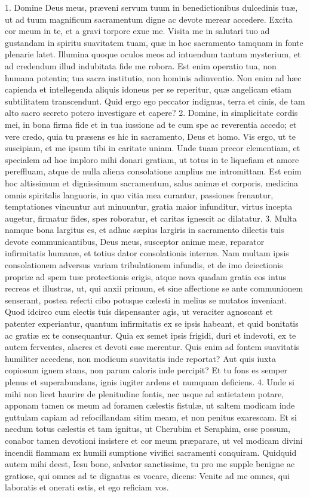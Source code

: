 1. Domine Deus meus, præveni servum tuum in benedictionibus dulcedinis tuæ, ut ad tuum magnificum sacramentum digne ac devote merear accedere. Excita cor meum in te, et a gravi torpore exue me. Visita me in salutari tuo ad gustandam in spiritu suavitatem tuam, quæ in hoc sacramento tamquam in fonte plenarie latet. Illumina quoque oculos meos ad intuendum tantum mysterium, et ad credendum illud indubitata fide me robora. Est enim operatio tua, non humana potentia; tua sacra institutio, non hominis adinventio. Non enim ad hæc capienda et intellegenda aliquis idoneus per se reperitur, quæ angelicam etiam subtilitatem transcendunt. Quid ergo ego peccator indignus, terra et cinis, de tam alto sacro secreto potero investigare et capere?
2. Domine, in simplicitate cordis mei, in bona firma fide et in tua iussione ad te cum spe ac reverentia accedo; et vere credo, quia tu præsens es hic in sacramento, Deus et homo. Vis ergo, ut te suscipiam, et me ipsum tibi in caritate uniam. Unde tuam precor clementiam, et specialem ad hoc imploro mihi donari gratiam, ut totus in te liquefiam et amore pereffluam, atque de nulla aliena consolatione amplius me intromittam. Est enim hoc altissimum et dignissimum sacramentum, salus animæ et corporis, medicina omnis spiritalis languoris, in quo vitia mea curantur, passiones frenantur, temptationes vincuntur aut minuuntur, gratia maior infunditur, virtus incepta augetur, firmatur fides, spes roboratur, et caritas ignescit ac dilatatur.
3. Multa namque bona largitus es, et adhuc sæpius largiris in sacramento dilectis tuis devote communicantibus, Deus meus, susceptor animæ meæ, reparator infirmitatis humanæ, et totius dator consolationis internæ. Nam multam ipsis consolationem adversus variam tribulationem infundis, et de imo deiectionis propriæ ad spem tuæ protectionis erigis, atque nova quadam gratia eos intus recreas et illustras, ut, qui anxii primum, et sine affectione se ante communionem senserant, postea refecti cibo potuque cælesti in melius se mutatos inveniant. Quod idcirco cum electis tuis dispensanter agis, ut veraciter agnoscant et patenter experiantur, quantum infirmitatis ex se ipsis habeant, et quid bonitatis ac gratiæ ex te consequantur. Quia ex semet ipsis frigidi, duri et indevoti, ex te autem ferventes, alacres et devoti esse merentur. Quis enim ad fontem suavitatis humiliter accedens, non modicum suavitatis inde reportat? Aut quis iuxta copiosum ignem stans, non parum caloris inde percipit? Et tu fons es semper plenus et superabundans, ignis iugiter ardens et numquam deficiens.
4. Unde si mihi non licet haurire de plenitudine fontis, nec usque ad satietatem potare, apponam tamen os meum ad foramen cælestis fistulæ, ut saltem modicam inde guttulam capiam ad refocillandam sitim meam, et non penitus exarescam. Et si necdum totus cælestis et tam ignitus, ut Cherubim et Seraphim, esse possum, conabor tamen devotioni insistere et cor meum præparare, ut vel modicam divini incendii flammam ex humili sumptione vivifici sacramenti conquiram. Quidquid autem mihi deest, Iesu bone, salvator sanctissime, tu pro me supple benigne ac gratiose, qui omnes ad te dignatus es vocare, dicens: Venite ad me omnes, qui laboratis et onerati estis, et ego reficiam vos.
